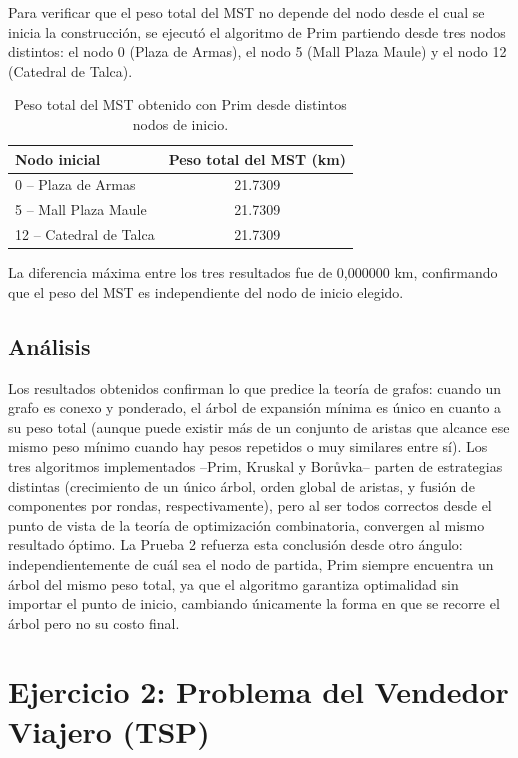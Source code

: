 \documentclass[12pt,letterpaper]{article}
\begin{document}
Para verificar que el peso total del MST no depende del nodo desde el cual se inicia la
construcción, se ejecutó el algoritmo de Prim partiendo desde tres nodos distintos: el nodo 0
(Plaza de Armas), el nodo 5 (Mall Plaza Maule) y el nodo 12 (Catedral de Talca).

\begin{table}[H]
\centering
\begin{tabular}{lc}
\toprule
\textbf{Nodo inicial} & \textbf{Peso total del MST (km)} \\
\midrule
0  -- Plaza de Armas     & 21.7309 \\
5  -- Mall Plaza Maule   & 21.7309 \\
12 -- Catedral de Talca  & 21.7309 \\
\bottomrule
\end{tabular}
\caption{Peso total del MST obtenido con Prim desde distintos nodos de inicio.}
\end{table}

La diferencia máxima entre los tres resultados fue de 0,000000 km, confirmando que el peso del
MST es independiente del nodo de inicio elegido.

\subsection{Análisis}

Los resultados obtenidos confirman lo que predice la teoría de grafos: cuando un grafo es conexo
y ponderado, el árbol de expansión mínima es único en cuanto a su peso total (aunque puede
existir más de un conjunto de aristas que alcance ese mismo peso mínimo cuando hay pesos
repetidos o muy similares entre sí). Los tres algoritmos implementados --Prim, Kruskal y
Borůvka-- parten de estrategias distintas (crecimiento de un único árbol, orden global de
aristas, y fusión de componentes por rondas, respectivamente), pero al ser todos correctos
desde el punto de vista de la teoría de optimización combinatoria, convergen al mismo resultado
óptimo. La Prueba 2 refuerza esta conclusión desde otro ángulo: independientemente de cuál sea
el nodo de partida, Prim siempre encuentra un árbol del mismo peso total, ya que el algoritmo
garantiza optimalidad sin importar el punto de inicio, cambiando únicamente la forma en que se
recorre el árbol pero no su costo final.

\section{Ejercicio 2: Problema del Vendedor Viajero (TSP)}
\end{document}
